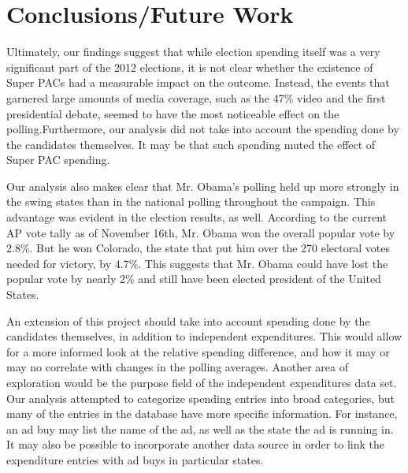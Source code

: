 \documentclass[11pt]{article}\usepackage{graphicx, color}
\begin{document}
\section{Conclusions/Future Work}
Ultimately, our findings suggest that while election spending itself was a very significant part of the 2012 elections, it is not clear whether the existence of Super PACs had a measurable impact on the outcome. Instead, the events that garnered large amounts of media coverage, such as the 47\% video and the first presidential debate, seemed to have the most noticeable effect on the polling.Furthermore, our analysis did not take into account the spending done by the candidates themselves. It may be that such spending muted the effect of Super PAC spending.

Our analysis also makes clear that Mr. Obama's polling held up more strongly in the swing states than in the national polling throughout the campaign. This advantage was evident in the election results, as well. According to the current AP vote tally as of November 16th, Mr. Obama won the overall popular vote by 2.8\%. But he won Colorado, the state that put him over the 270 electoral votes needed for victory, by 4.7\%. This suggests that Mr. Obama could have lost the popular vote by nearly 2\% and still have been elected president of the United States.

An extension of this project should take into account spending done by the candidates themselves, in addition to independent expenditures. This would allow for a more informed look at the relative spending difference, and how it may or may no correlate with changes in the polling averages. Another area of exploration would be the purpose field of the independent expenditures data set. Our analysis attempted to categorize spending entries into broad categories, but many of the entries in the database have more specific information. For instance, an ad buy may list the name of the ad, as well as the state the ad is running in. It may also be possible to incorporate another data source in order to link the expenditure entries with ad buys in particular states.
\end{document}
